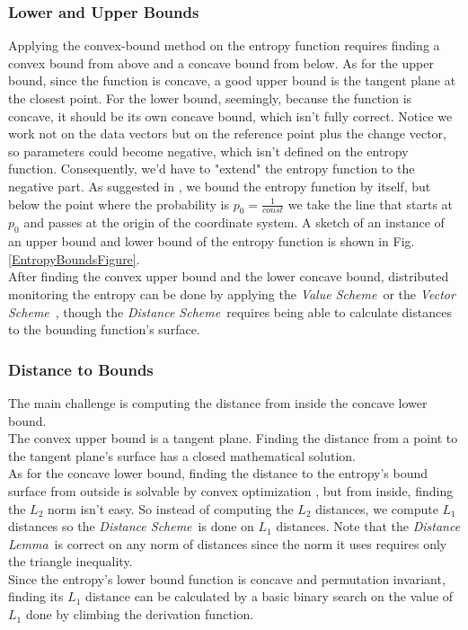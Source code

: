 \documentclass[10pt, conference]{IEEEtran}
\newcommand{\vectorScheme}{\textit{Vector Scheme}}
\newcommand{\valueScheme}{\textit{Value Scheme}}
\newcommand{\distanceScheme}{\textit{Distance Scheme}}
\newcommand{\distanceLemma}{\textit{Distance Lemma}}
\begin{document}
\subsubsection{Lower and Upper Bounds}
Applying the convex-bound method on the entropy function requires finding a convex bound from above and a concave bound from below. As for the upper bound, since the function is concave, a good upper bound is the tangent plane at the closest point. For the lower bound, seemingly, because the function is concave, it should be its own concave bound, which isn't fully correct. Notice we work not on the data vectors but on  the reference point plus the change vector, so parameters could become negative, which isn't defined on the entropy function. Consequently, we'd have to "extend" the entropy function to the negative part. As  suggested in \cite{gabel2017anarchists}, we bound the entropy function by itself, but below the point where the probability is $p_0 = \frac{1}{const}$ we take the line that starts at $p_0$ and passes at the origin of the coordinate system. A sketch of an instance of an upper bound and lower bound of the entropy function is shown in Fig. \ref{EntropyBoundsFigure}. \\
After finding the convex upper bound and the lower concave bound, distributed monitoring the entropy can be done by applying the \valueScheme \ or the \vectorScheme \ , though the \distanceScheme \ requires being able to calculate distances to the bounding function's surface. \\
\subsubsection{Distance to Bounds}
The main challenge is computing the distance from inside the concave lower bound.  \\
The convex upper bound is a tangent plane. Finding the distance from a point to the tangent plane's surface has a closed mathematical solution. \\
As for the concave lower bound, finding the distance to the entropy's bound surface from outside is solvable by convex optimization \cite{boyd2004convex}, but from inside, finding the $L_2$ norm isn't easy. So instead of computing the $L_2$ distances, we compute $L_1$ distances so the \distanceScheme \ is done on $L_1$ distances. Note that the \distanceLemma \ is correct on any norm of distances since the norm it uses requires only the triangle inequality. \\
Since the entropy's lower bound function is concave and permutation invariant, finding its $L_1$ distance can be calculated by a basic binary search on the value of $L_1$ done by climbing the derivation function. \\
\end{document}
